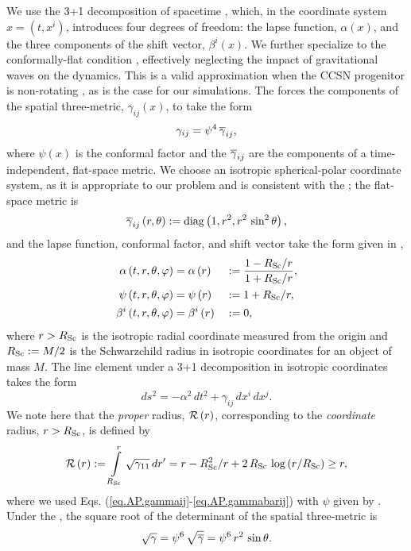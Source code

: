 We use the 3+1 decomposition of spacetime
\citep[see, e.g.,][for details]{bfi1997,g2012,rz2013},
which, in the coordinate system
$x=\left(t,x^{i}\right)$,
introduces four degrees of freedom:
the lapse function, $\alpha\left(x\right)$,
and the three components of the shift vector,
$\beta^{i}\left(x\right)$.
We further specialize to the conformally-flat condition
\citep[\cfc{},][]{wmm1996},
effectively neglecting the impact of gravitational waves on
the dynamics.
This is a valid approximation when the CCSN progenitor is non-rotating
\citep{dnf2005}, as is the case for our simulations.
The \cfc{} forces the components of the
spatial three-metric, $\gamma_{ij}\left(x\right)$,
to take the form
\begin{equation}
  \gamma_{ij}
  =\psi^{4}\,\overline{\gamma}_{ij},
  \label{eq.AP.gammaij}
\end{equation}
where $\psi\left(x\right)$ is the conformal factor
and the $\overline{\gamma}_{ij}$ are the components of a time-independent,
flat-space metric.
We choose an isotropic spherical-polar coordinate system,
as it is appropriate to our problem and is consistent with the \cfc;
the flat-space metric is
\begin{equation}
  \overline{\gamma}_{ij}\left(r,\theta\right)
  :=\mathrm{diag}\left(1,r^{2},r^{2}\,\sin^{2}\theta\right),
  \label{eq.AP.gammabarij}
\end{equation}
and the lapse function, conformal factor, and shift vector
take the form given in \citet{bs2010},
\begin{alignat}{2}
  \alpha   \left(t,r,\theta,\varphi\right)&=\alpha   \left(r\right)
    &&:=\frac{1-R_{\mathrm{Sc}}/r}{1+R_{\mathrm{Sc}}/r},\\
  \psi     \left(t,r,\theta,\varphi\right)&=\psi     \left(r\right)
    &&:=1+R_{\mathrm{Sc}}/r,\label{eq.AP.psi}\\
  \beta^{i}\left(t,r,\theta,\varphi\right)&=\beta^{i}\left(r\right)
    &&:=0,
\end{alignat}
where $r>R_{\mathrm{Sc}}$ is the isotropic radial coordinate measured from the
origin and $R_{\mathrm{Sc}}:=M/2$ is the Schwarzchild radius in
isotropic coordinates for an object of mass $M$.
The line element under a 3+1 decomposition in
isotropic coordinates takes the form
\begin{equation}
  ds^{2}=-\alpha^{2}\,dt^{2}+\gamma_{ij}\,dx^{i}\,dx^{j}.
  \label{eq.AP.ds2}
\end{equation}
We note here that the {\sl proper} radius, $\mathcal{R}\left(r\right)$,
corresponding to the {\sl coordinate} radius, $r>R_{\mathrm{Sc}}$, is defined by
\begin{equation}
  \mathcal{R}\left(r\right)
  :=\int\limits_{R_{\mathrm{Sc}}}^{r}\sqrt{\gamma_{11}}\,
  dr'
  =r-R_{\mathrm{Sc}}^{2}/r+2\,R_{\mathrm{Sc}}\,\log\left(r/R_{\mathrm{Sc}}\right)\geq r,
  \label{eq.AP.properDistance}
\end{equation}
where we used Eqs. (\ref{eq.AP.gammaij}-\ref{eq.AP.gammabarij})
with $\psi$ given by .
Under the \cfc{}, the square root of the determinant of the spatial
three-metric is
\begin{equation}
    \sqrt{\gamma}=\psi^{6}\,\sqrt{\overline{\gamma}}=\psi^{6}\,r^{2}\,\sin\theta.
\end{equation}

